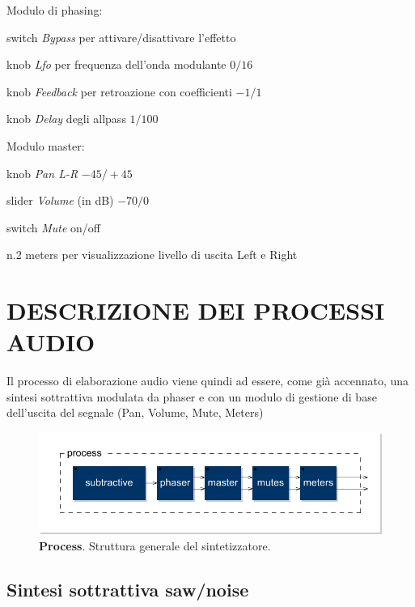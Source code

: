 \documentclass[
	a4paper,
	twocolumn
	]{article}
\begin{document}
\bigskip

\noindent Modulo di phasing:

\begin{compactitem}
  \item switch \emph{Bypass} per attivare/disattivare l’effetto
  \item knob \emph{Lfo} per frequenza dell’onda modulante $0/16$
  \item knob \emph{Feedback} per retroazione con coefficienti $-1/1$
  \item knob \emph{Delay} degli allpass $1/100$
\end{compactitem}

\bigskip

\noindent Modulo master:

\begin{compactitem}
  \item knob \emph{Pan L-R} $-45/+45$
  \item slider \emph{Volume} (in dB) $-70/0$
  \item switch \emph{Mute} on/off
  \item n.2 meters per visualizzazione livello di uscita Left e Right
\end{compactitem}

\section*{DESCRIZIONE DEI PROCESSI AUDIO}

Il processo di elaborazione audio viene quindi ad essere, come già accennato,
una sintesi sottrattiva modulata da phaser e con un modulo di gestione di base
dell'uscita del segnale (Pan, Volume, Mute, Meters)

\begin{figure}[h]
\begin{center}
\includegraphics[width=.47\textwidth]{img/process.pdf}
\caption{\textbf{Process}. Struttura generale del sintetizzatore.}
\label{process}
\end{center}
\end{figure}

\subsection*{Sintesi sottrattiva saw/noise}
\end{document}
